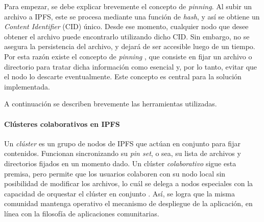 Para empezar, se debe explicar brevemente el concepto de \textit{pinning}. Al subir un archivo a IPFS, este se procesa mediante una función de \textit{hash}, y así se obtiene un \textit{Content Identifier} (CID) único. Desde ese momento, cualquier nodo que desee obtener el archivo puede encontrarlo utilizando dicho CID. Sin embargo, no se asegura la persistencia del archivo, y dejará de ser accesible luego de un tiempo. Por esta razón existe el concepto de \textit{pinning} \cite{pinning}, que consiste en fijar un archivo o directorio para tratar dicha información como esencial y, por lo tanto, evitar que el nodo lo descarte eventualmente. Este concepto es central para la solución implementada.

A continuación se describen brevemente las herramientas utilizadas.

\paragraph{Clústeres colaborativos en IPFS} Un \textit{clúster} es un grupo de nodos de IPFS que actúan en conjunto para fijar contenidos. Funcionan sincronizando su \textit{pin set}, o sea, su lista de archivos y directorios fijados en un momento dado. Un clúster \textit{colaborativo} sigue esta premisa, pero permite que los usuarios colaboren con su nodo local sin posibilidad de modificar los archivos, lo cuál se delega a nodos especiales con la capacidad de orquestar el clúster en conjunto \cite{collaborative-clusters}. Así, se logra que la misma comunidad mantenga operativo el mecanismo de despliegue de la aplicación, en línea con la filosofía de aplicaciones comunitarias.



